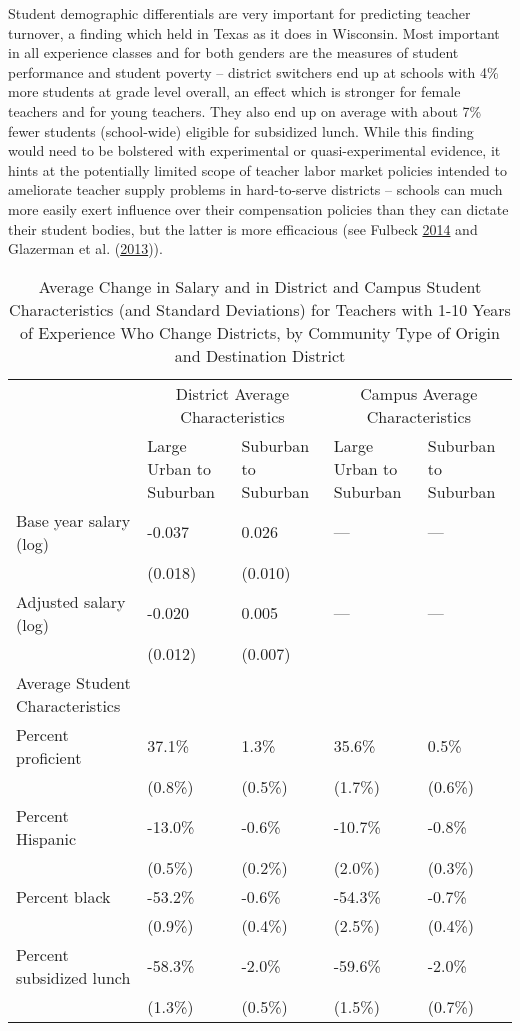\documentclass[12pt,]{article}
\begin{document}
Student demographic differentials are very important for predicting
teacher turnover, a finding which held in Texas as it does in Wisconsin.
Most important in all experience classes and for both genders are the
measures of student performance and student poverty -- district
switchers end up at schools with 4\% more students at grade level
overall, an effect which is stronger for female teachers and for young
teachers. They also end up on average with about 7\% fewer students
(school-wide) eligible for subsidized lunch. While this finding would
need to be bolstered with experimental or quasi-experimental evidence,
it hints at the potentially limited scope of teacher labor market
policies intended to ameliorate teacher supply problems in hard-to-serve
districts -- schools can much more easily exert influence over their
compensation policies than they can dictate their student bodies, but
the latter is more efficacious (see Fulbeck
\protect\hyperlink{ref-fulbeck}{2014} and Glazerman et al.
(\protect\hyperlink{ref-glazerman}{2013})).

\begin{table}[htbp]
\centering
\begin{tabular}{lp{}p{}p{}p{}}
  \hline
 & \multicolumn{2}{c}{District Average Characteristics} & \multicolumn{2}{c}{Campus Average Characteristics}\\ \cline{2-5}
 & Large Urban to Suburban & Suburban to Suburban & Large Urban to Suburban & Suburban to Suburban \\
  \hline
Base year salary (log) & -0.037 & 0.026 & --- & --- \\ 
   & (0.018) & (0.010) &  &  \\ 
  Adjusted salary (log) & -0.020 & 0.005 & --- & --- \\ 
   & (0.012) & (0.007) &  &  \\ 
Average Student Characteristics & & & & \\
  \quad Percent proficient & 37.1\% & 1.3\% & 35.6\% & 0.5\% \\ 
   & (0.8\%) & (0.5\%) & (1.7\%) & (0.6\%) \\ 
  \quad Percent Hispanic & -13.0\% & -0.6\% & -10.7\% & -0.8\% \\ 
   & (0.5\%) & (0.2\%) & (2.0\%) & (0.3\%) \\ 
  \quad Percent black & -53.2\% & -0.6\% & -54.3\% & -0.7\% \\ 
   & (0.9\%) & (0.4\%) & (2.5\%) & (0.4\%) \\ 
  \quad Percent subsidized lunch & -58.3\% & -2.0\% & -59.6\% & -2.0\% \\ 
   & (1.3\%) & (0.5\%) & (1.5\%) & (0.7\%) \\ 
   \hline
\end{tabular}
\caption{Average Change in Salary and in District and Campus Student Characteristics (and Standard Deviations) for Teachers with 1-10 Years of Experience Who Change Districts, by Community Type of Origin and Destination District} 
\label{tbl:change_by_urb}
\end{table}
\end{document}

